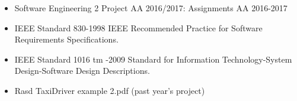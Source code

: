 \begin{itemize}
	\item Software Engineering 2 Project AA 2016/2017: Assignments AA 2016-2017	
	\item IEEE Standard 830-1998 IEEE Recommended Practice for Software Requirements Specifications.
	\item IEEE Standard 1016 tm -2009 Standard for Information Technology-System Design-Software Design Descriptions.
	\item Rasd TaxiDriver example 2.pdf (past year's project)
\end{itemize}